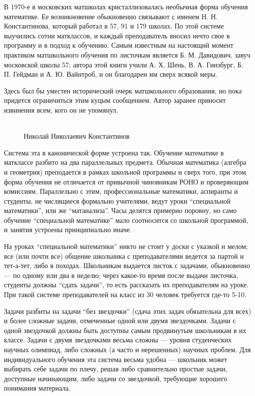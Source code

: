 \documentclass[12pt]{book}
\theoremstyle{upshape}
\theoremstyle{generic}
\theoremstyle{upshapenonumber}
\newcommand{\следствие}{%
     \refstepcounter{teorema}
     {\noindent\bf Следствие \thechapter.\arabic{teorema}:\ }}
\newcommand{\пример}{%
     \refstepcounter{teorema}
     {\noindent\bf Пример \thechapter.\arabic{teorema}:\ }}
\newcommand{\лемма}{%
     \refstepcounter{teorema}
     {\noindent\bf Лемма \thechapter.\arabic{teorema}:\ }}
\newcommand{\теорема}{%
     \refstepcounter{teorema}
     {\noindent\bf Теорема \thechapter.\arabic{teorema}:\ }}
\newcommand{\утверждение}{%
     \refstepcounter{teorema}
     {\noindent\bf Утверждение \thechapter.\arabic{teorema}:\ }}
\begin{document}

В 1970-е в московских матшколах кристаллизовалась
необычная форма обучения математике. Ее возникновение
обыкновенно связывают с именем Н. Н. Константинова, 
который работал в 57, 91 и 179 школах. По этой
системе выучились сотни матклассов, и каждый 
преподаватель вносил нечто свое в программу и в подход к
обучению. Самым известным на настоящий момент практиком
матшкольного обучения по листочкам является
Б. М. Давидович, завуч московской школы 57;
автора этой книги учили А. Х. Шень, В. А. Гинзбург,
Б. П. Гейдман и А. Ю. Вайнтроб, и он благодарен им сверх 
всякой меры.

Здесь был бы уместен исторический очерк матшкольного
образования, но пока придется ограничиться этим куцым сообщением.
Автор заранее приносит извинения всем, кого он не упомянул.


\begin{figure}[ht]
\begin{center}
\\
Николай Николаевич Константинов
\end{center}
\end{figure}


Система эта в канонической форме устроена так.
Обучение математике в матклассе разбито на два
параллельных предмета. Обычная математика (алгебра
и геометрия) преподается в рамках школьной программы
и сверх того, при этом форма обучения не отличается
от привычной чиновникам РОНО и проверяющим комиссиям.
Параллельно с этим, профессиональные математики,
аспиранты и студенты, не числящиеся формально
учителями, ведут уроки ``специальной математики'',
или же ``матанализа''. Часы делятся примерно поровну,
но само обучение ``специальной математике'' мало
соотносится со школьной программой, и занятия
устроены принципиально иначе.

На уроках ``специальной математики''
никто не стоит у доски с указкой и мелом;
все (или почти все) общение школьника с преподавателями
ведется за партой и тет-а-тет, либо в походах.
Школьникам выдается листок с задачами, обыкновенно ---
по одному или два в неделю; через какое-то время
после выдачи листочка, студенты должны ``сдать
задачи'', то есть рассказать их преподавателям 
на уроке. При такой системе преподавателей на
класс из 30 человек требуется где-то 5-10.

Задачи разбиты на задачи ``без звездочки'' (сдача
этих задач обязательна для всех) и более сложные
задачи, отмеченные одной или двумя звездочками.
Задачи с одной звездочкой должны быть доступны
самым продвинутым школьникам в их классе.
Задачи с двумя звездочками весьма сложны ---  
уровня студенческих научных олимпиад,
либо сложных (а часто и нерешенных)
научных проблем. Для индивидуального
обучения эта система весьма удобна ---
школьник может выбирать себе задачи
по плечу, решая либо сравнительно
простые задачи, доступные начинающим,
либо задачи со звездочкой, требующие
хорошего понимания материала.
\end{document}

